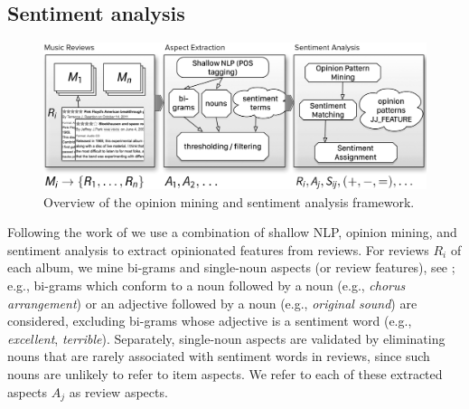 \subsection{Sentiment analysis}
\label{sec:musicology:sentiment}

\begin{figure}
\includegraphics[width=\columnwidth]{ch05_musicology_pics/omf_bn.pdf}
\caption{Overview of the opinion mining and sentiment analysis framework.}
\label{fig:musicology:OMF}
\end{figure}

Following the work of \cite{DongSOS13,DongOS14} we use a combination of shallow NLP, opinion mining, and sentiment analysis to extract opinionated features from reviews. For reviews $R_{i}$ of each album, we mine bi-grams and single-noun aspects (or review features), see \cite{Hu2004}; e.g., bi-grams which conform to a noun followed by a noun (e.g., \emph{chorus arrangement}) or an adjective followed by a noun (e.g., \emph{original sound}) are considered, excluding bi-grams whose adjective is a sentiment word (e.g., \emph{excellent}, \emph{terrible}). Separately, single-noun aspects are validated by eliminating nouns that are rarely associated with sentiment words in reviews, since such nouns are unlikely to refer to item aspects. We refer to each of these extracted aspects $A_{j}$ as review aspects.

